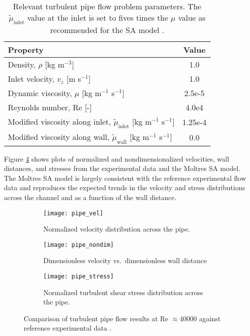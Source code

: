 \begin{table}[htb]
  \centering
  \small
  \caption{Relevant turbulent pipe flow problem parameters. The $\tilde{\mu}_\text{inlet}$ value
  at the inlet is set to fives times the $\mu$ value as recommended for the \gls{SA} model
  \cite{spalart_one-equation_1994}.}
  \begin{tabular}{l S}
    \toprule
    Property & {Value} \\
    \midrule
    Density, $\rho$ [kg m$^{-3}$] & 1.0 \\
    Inlet velocity, $v_z$ [m s$^{-1}$] & 1.0 \\
    Dynamic viscosity, $\mu$ [kg m$^{-1}$ s$^{-1}$] & 2.5e-5 \\
    Reynolds number, Re [-] & 4.0e4 \\
    Modified viscosity along inlet, $\tilde{\mu}_\text{inlet}$ [kg m$^{-1}$ s$^{-1}$] & 1.25e-4 \\
    Modified viscosity along wall, $\tilde{\mu}_\text{wall}$ [kg m$^{-1}$ s$^{-1}$] & 0.0 \\
    \bottomrule
  \end{tabular}
  \label{table:pipe}
\end{table}

Figure \ref{fig:pipe-verification} shows plots of normalized and nondimensionalized velocities,
wall distances, and stresses from the experimental data \cite{laufer_structure_1954}
and the Moltres \gls{SA} model. The Moltres \gls{SA} model is largely consistent with the reference
experimental flow data and reproduces the expected trends in the velocity and stress distributions
across the channel and as a function of the wall distance.

\begin{figure}[htb]
  \centering
  \begin{subfigure}[b]{0.48\columnwidth}
    \centering
    \texttt{[image: pipe\_vel]}
    \caption{Normalized velocity distribution across the pipe.}
    \label{fig:pipe-vel}
  \end{subfigure}
  \hfill
  \begin{subfigure}[b]{0.48\columnwidth}
    \centering
    \texttt{[image: pipe\_nondim]}
    \caption{Dimensionless velocity vs.\ dimensionless wall distance}
    \label{fig:pipe-nondim}
  \end{subfigure}
  \begin{subfigure}[b]{0.48\columnwidth}
    \centering
    \texttt{[image: pipe\_stress]}
    \caption{Normalized turbulent shear stress distribution across the pipe.}
    \label{fig:pipe-stress}
  \end{subfigure}
  \caption{Comparison of turbulent pipe flow results at Re $\approx 40000$ against reference
  experimental data \cite{laufer_structure_1954}.}
  \label{fig:pipe-verification}
\end{figure}

